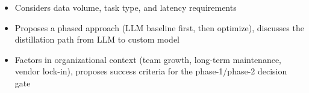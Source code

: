 \begin{interviewq}

\goodgreat
\begin{itemize}
    \item {} Considers data volume, task type, and latency requirements
    \item {} Proposes a phased approach (LLM baseline first, then optimize), discusses the distillation path from LLM to custom model
    \item {} Factors in organizational context (team growth, long-term maintenance, vendor lock-in), proposes success criteria for the phase-1/phase-2 decision gate
\end{itemize}

\end{interviewq}

